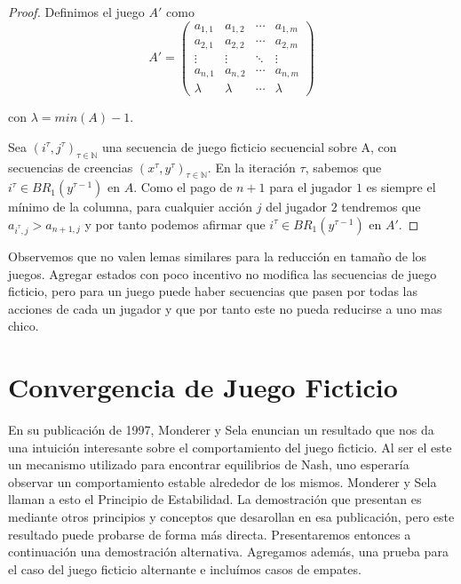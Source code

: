 \begin{proof}
    Definimos el juego $A'$ como
    \begin{equation*}
        A' =
        \begin{pmatrix}
        a_{1,1} & a_{1,2} & \cdots & a_{1,m}     \\
        a_{2,1} & a_{2,2} & \cdots & a_{2,m}    \\
        \vdots  & \vdots  & \ddots & \vdots                  \\
        a_{n,1} & a_{n,2} & \cdots & a_{n,m}    \\
        \lambda & \lambda & \cdots &\lambda
        \end{pmatrix}
    \end{equation*} 

    con $\lambda = min(A) - 1$.
    
    Sea $(i^\tau, j^\tau)_{\tau \in \mathbb{N}}$ una secuencia de juego ficticio secuencial sobre A, con secuencias de creencias $(x^\tau, y^\tau)_{\tau \in \mathbb{N}}$. En la iteración $\tau$, sabemos que $i^\tau \in BR_1(y^{\tau - 1})$ en $A$. Como el pago de $n+1$ para el jugador $1$ es siempre el mínimo de la columna, para cualquier acción $j$ del jugador $2$ tendremos que $a_{i^\tau, j} > a_{n+1,j}$ y por tanto podemos afirmar que $i^\tau \in BR_1(y^{\tau - 1})$ en $A'$.
\end{proof}


Observemos que no valen lemas similares para la reducción en tamaño de los juegos. Agregar estados con poco incentivo no modifica las secuencias de juego ficticio, pero para un juego puede haber secuencias que pasen por todas las acciones de cada un jugador y que por tanto este no pueda reducirse a uno mas chico.

\section{Convergencia de Juego Ficticio} \label{sec:convergencia:fp}

En su publicación de 1997, Monderer y Sela \cite{no:cycling} enuncian un resultado que nos da una intuición interesante sobre el comportamiento del juego ficticio. Al ser el este un mecanismo utilizado para encontrar equilibrios de Nash, uno esperaría observar un comportamiento estable alrededor de los mismos. Monderer y Sela llaman a esto el Principio de Estabilidad. La demostración que presentan es mediante otros principios y conceptos que desarollan en esa publicación, pero este resultado puede probarse de forma más directa. Presentaremos entonces a continuación una demostración alternativa. Agregamos además, una prueba para el caso del juego ficticio alternante e incluímos casos de empates.

